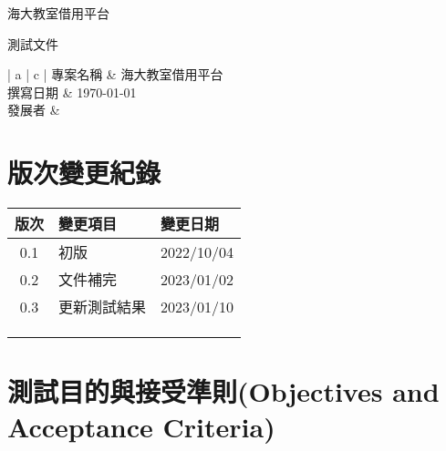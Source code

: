 \documentclass{article}
\begin{document}
\begin{titlepage}
	\centering

	{\huge 海大教室借用平台}

	\vfill

	{\huge 測試文件}

	\vfill

	\begin{Large}
		\begin{center}
			\begin{tabular}{| a | c |}
				\hline
				專案名稱 & 海大教室借用平台               \\ \hline
				撰寫日期 & \today                 \\ \hline
				發展者  &  \\ \hline
			\end{tabular}
		\end{center}
	\end{Large}
\end{titlepage}


\section*{版次變更紀錄}

\begin{tabularx}{\textwidth}{| c | X | X |}
	\rowcolor{LightGray}
	\hline
	版次  & 變更項目   & 變更日期       \\ \hline
	0.1 & 初版     & 2022/10/04 \\ \hline
	0.2 & 文件補完   & 2023/01/02 \\ \hline
	0.3 & 更新測試結果 & 2023/01/10 \\ \hline
	    &        &            \\ \hline
	    &        &            \\ \hline
	    &        &            \\ \hline
\end{tabularx}

\newpage

\begin{center}
	\tableofcontents
\end{center}

\newpage

\section[測試目的與接受準則(OBJECTIVES AND ACCEPTANCE CRITERIA)]{測試目的與接受準則(Objectives and Acceptance Criteria)}
\end{document}
